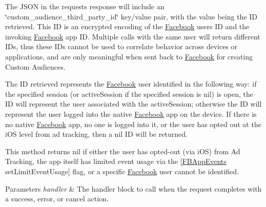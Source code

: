 The J\+S\+ON in the request\textquotesingle{}s response will include an \char`\"{}custom\+\_\+audience\+\_\+third\+\_\+party\+\_\+id\char`\"{} key/value pair, with the value being the ID retrieved. This ID is an encrypted encoding of the \hyperlink{interfaceFacebook}{Facebook} user\textquotesingle{}s ID and the invoking \hyperlink{interfaceFacebook}{Facebook} app ID. Multiple calls with the same user will return different I\+Ds, thus these I\+Ds cannot be used to correlate behavior across devices or applications, and are only meaningful when sent back to \hyperlink{interfaceFacebook}{Facebook} for creating Custom Audiences.

The ID retrieved represents the \hyperlink{interfaceFacebook}{Facebook} user identified in the following way\+: if the specified session (or active\+Session if the specified session is {\ttfamily nil}) is open, the ID will represent the user associated with the active\+Session; otherwise the ID will represent the user logged into the native \hyperlink{interfaceFacebook}{Facebook} app on the device. If there is no native \hyperlink{interfaceFacebook}{Facebook} app, no one is logged into it, or the user has opted out at the i\+OS level from ad tracking, then a {\ttfamily nil} ID will be returned.

This method returns {\ttfamily nil} if either the user has opted-\/out (via i\+OS) from Ad Tracking, the app itself has limited event usage via the {\ttfamily \mbox{[}\hyperlink{interfaceFBAppEvents}{F\+B\+App\+Events} set\+Limit\+Event\+Usage\mbox{]}} flag, or a specific \hyperlink{interfaceFacebook}{Facebook} user cannot be identified.


\begin{DoxyParams}{Parameters}
{\em handler} & The handler block to call when the request completes with a success, error, or cancel action. \\
\hline
\end{DoxyParams}
\mbox{\label{interfaceFBRequestConnection_ab2ed1b7d417b4c723b37512870a5add9}} 
